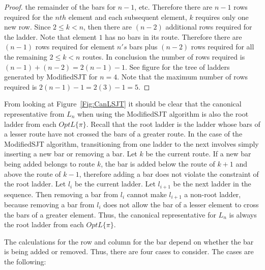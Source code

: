 \begin{proof}
  the remainder of the bars for $n-1$, etc. Therefore there are $n-1$ rows required for the $nth$ element and each subsequent 
  element, $k$ requires only one new row. Since $2 \leq k < n$, then there are $(n-2)$ additional rows required for the ladder. Note that element 
  $1$ has no bars in its route. Therefore there are $(n-1)$ rows required for element $n's$ bars  plus $(n-2)$ rows required for 
  all the remaining $2 \leq k < n$ routes. In conclusion the number of rows required is $(n-1) + (n-2) = 2(n-1)-1$. 
  See figure for the tree of ladders 
  generated by {\sc ModifiedSJT} for $n=4$. Note that the maximum number of rows required is $2(n-1)-1=2(3)-1=5$.
\end{proof}



From looking at Figure~\ref{Fig:CanLSJT} it should be clear that the canonical representative from $L_{n}$ when using the 
{\sc ModifiedSJT} algorithm is also the root ladder from each $OptL\{\pi\}$. Recall that the root ladder is the 
ladder whose bars of a lesser route have not crossed the bars of a greater route. In the case of the 
{\sc ModifiedSJT} algorithm, transitioning from one ladder to the next involves simply inserting a new bar 
or removing a bar. Let $k$ be the current route. If a new bar being added belongs to 
route $k$, the bar is added below the route of $k+1$ and above the route of $k-1$, therefore 
adding a bar does not violate the constraint of the root ladder. Let $l_{i}$ be the current ladder.
Let $l_{i+1}$ be the next ladder in the sequence. 
Then removing a bar from $l_{i}$ cannot make $l_{i+1}$ a non-root ladder, because 
removing a bar from $l_{i}$ does not allow the bar of a lesser element to cross the bars of a greater element.
Thus, the canonical representative for $L_{n}$ is always the root ladder from each $OptL\{\pi\}$.\par 



The calculations for the row and column for the bar 
depend on whether the bar is being added or removed. Thus, there are
four cases to consider. The cases are the following: 
\begin{caseof}
 ~
 ~
 ~
 ~
\end{caseof}


